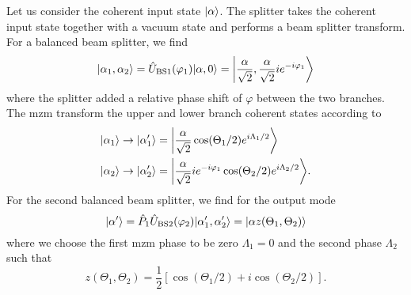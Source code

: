 Let us consider the coherent input state $\ket{\alpha}$.
The splitter takes the coherent input state together with a vacuum state and performs a beam splitter transform.
For a balanced beam splitter, we find
\begin{equation}
	\ket{\alpha_1,\alpha_2}
	=
	\hat{U}_\text{BS1}(\varphi_1)
	\ket{\alpha,0}
	=
	\ket*{\frac{\alpha}{\sqrt{2}},\frac{\alpha}{\sqrt{2}}ie^{-i\varphi_1}}
\end{equation}
where the splitter added a relative phase shift of $\varphi$ between the two branches.
The \gls{mzm} transform the upper and lower branch coherent states according to
\begin{align}
	\ket{\alpha_1}
	&\to
	\ket{\alpha_1^\prime}
	=
	\ket*{\frac{\alpha}{\sqrt{2}}\cos(\Theta_1/2)e^{i\Lambda_1/2}}
	\\
	\ket{\alpha_2}
	&\to
	\ket{\alpha_2^\prime}
	=
	\ket*{\frac{\alpha}{\sqrt{2}}ie^{-i\varphi_1}\cos(\Theta_2/2)e^{i\Lambda_2/2}}
	.
\end{align}
For the second balanced beam splitter, we find for the output mode
\begin{equation}
	\ket{\alpha^\prime}
	=
	\hat{P}_1
	\hat{U}_\text{BS2}(\varphi_2)
	\ket{\alpha_1^\prime,\alpha_2^\prime}
	=
	\ket{\alpha z(\Theta_1,\Theta_2)}
\end{equation}
where we choose the first \gls{mzm} phase to be zero $\Lambda_1=0$ and the second phase $\Lambda_2$ such that
\begin{equation}
	z(\Theta_1,\Theta_2)
	=
	\frac{1}{2}
	\left[
		\cos(\Theta_1/2)
		+
		i\cos(\Theta_2/2)
	\right]
	.
\end{equation}